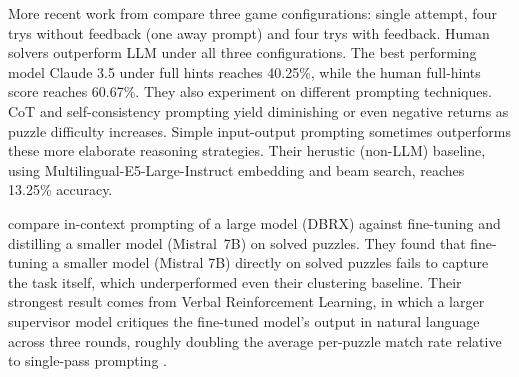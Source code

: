 More recent work from \citeauthor{loredolopezNYTConnectionsDeceptivelySimple2025} compare three game configurations: single attempt, four trys without feedback (one away prompt) and four trys with feedback. Human solvers outperform LLM under all three configurations. The best performing model Claude 3.5 under full hints reaches 40.25\%, while the human full-hints score reaches 60.67\%. They also experiment on different prompting techniques. \ac{CoT} and self-consistency prompting yield diminishing or even negative returns as puzzle difficulty increases. Simple input-output prompting sometimes outperforms these more elaborate reasoning strategies. Their herustic (non-LLM) baseline, using Multilingual-E5-Large-Instruct embedding and beam search, reaches 13.25\% accuracy.

\citeauthor{zhangLearningSemanticComplexities} compare in-context prompting of a large model (DBRX) against fine-tuning and distilling a smaller model (Mistral~7B) on solved puzzles. They found that fine-tuning a smaller model (Mistral 7B) directly on solved puzzles fails to capture the task itself, which underperformed even their clustering baseline. Their strongest result comes from Verbal Reinforcement Learning, in which a larger supervisor model critiques the fine-tuned model's output in natural language across three rounds, roughly doubling the average per-puzzle match rate relative to single-pass prompting \cite{zhangLearningSemanticComplexities}.


